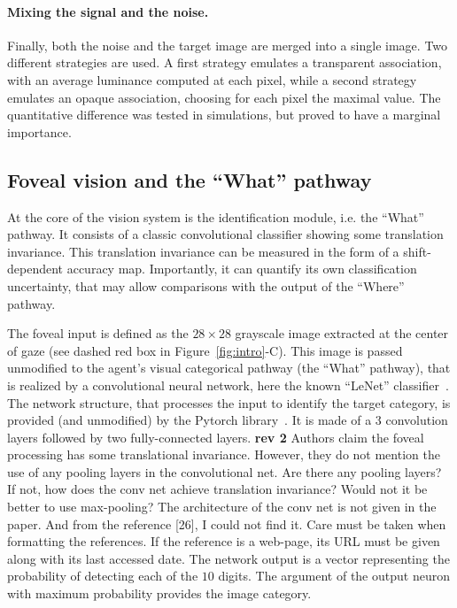 \paragraph{Mixing the signal and the noise.} Finally, both the noise and the target image are merged into a single image. Two different strategies are used. A first strategy emulates a transparent association, with an average luminance computed at each pixel, while a second strategy emulates an opaque association, choosing for each pixel the maximal value. The quantitative difference was tested in simulations, but proved to have a marginal importance.
%
\subsection*{Foveal vision and the ``What'' pathway}
%


At the core of the vision system is the identification module, i.e. the ``What'' pathway. It consists of a classic convolutional classifier showing some translation invariance. This translation invariance can be measured in the form of a shift-dependent accuracy map. Importantly, it can quantify its own classification uncertainty, that may allow comparisons with the output of the ``Where'' pathway.

The foveal input is defined as the $28\times 28$ grayscale image extracted at the center of gaze (see dashed red box in Figure~\ref{fig:intro}-C). 
This image is passed unmodified to the agent's visual categorical pathway (the ``What'' pathway), that is realized by a convolutional neural network, here  the known ``LeNet'' classifier~\cite{Lecun1998}. The network structure, that processes the input to identify the target category, is  provided (and unmodified) by the Pytorch library~\cite{Paszke17}.
It is made of a 3 convolution layers followed by two fully-connected layers.
{\color{red} \textbf{rev 2} Authors claim the foveal processing has some translational invariance. However, they do not mention the use of any pooling layers in the convolutional net. Are there any pooling layers? If not, how does the conv net achieve translation invariance? Would not it be better to use max-pooling?  The architecture of the conv net is not given in the paper. And from the reference [26], I could not find it. Care must be taken when formatting the references. If the reference is a web-page, its URL must be given along with its last accessed date. }
The network output is a vector representing the probability of detecting each of the $10$ digits. The argument of the output neuron with maximum probability provides the image category. 

